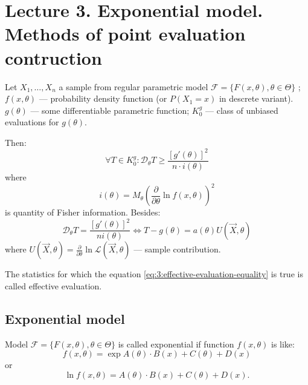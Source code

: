 \section{Lecture 3. Exponential model. Methods of point evaluation contruction}

Let $X_1, \ldots, X_n$ a sample from regular parametric model
$\mathcal{F} = \{F(x, \theta), \theta \in \Theta\} $ ;
$f(x, \theta)$ --- probability density function (or $P(X_1 = x)$ in
descrete variant).
$g(\theta)$ --- some differentiable parametric function;
$K_{0}^{g}$ --- class of unbiased evaluations for $g(\theta)$.

Then:
\begin{equation}
    \label{eq:3:effective-evaluation-equality}
    \forall T \in K_{0}^{g}: \mathcal{D}_{\theta} T \geq \frac{\left[ 
    g'(\theta)\right] ^2}{n\cdot i(\theta)}
\end{equation}
where
\[
i(\theta) = M_{\theta}\left( \frac{\partial}{\partial \theta} \ln f(x, \theta) \right) ^2
\] 
is quantity of Fisher information.
Besides:
\[
\mathcal{D}_{\theta} T = \frac{\left[ g'(\theta) \right] ^2}{n i(\theta)} \iff
T - g(\theta) = a(\theta) U(\vec{X}, \theta)
\] 
where  $U(\vec{X}, \theta) = \frac{\partial}{\partial \theta} \ln
\mathcal{L}(\vec{X}, \theta)$ --- sample contribution.

The statistics for which the equation \ref{eq:3:effective-evaluation-equality}
is true is called effective evaluation.



\subsection{Exponential model}

\begin{definition}
    Model $\mathcal{F} = \{F(x, \theta), \theta \in \Theta\} $ is called 
    exponential if function $f(x, \theta)$ is like:
    \[
        f(x, \theta) = \exp{A(\theta) \cdot B(x) + C(\theta) + D(x)}
    \] 
    or
    \[
    \ln f(x, \theta) = A(\theta) \cdot B(x) + C(\theta) + D(x)
    .\] 
\end{definition}

